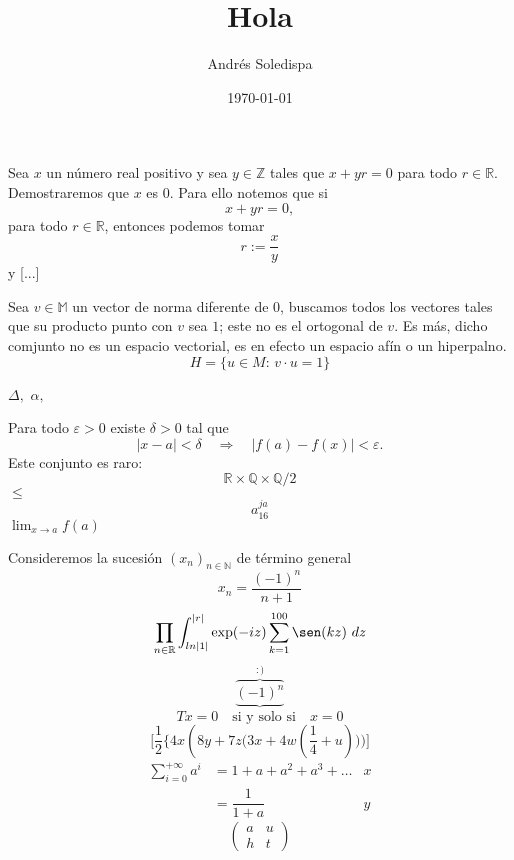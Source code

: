 \documentclass[a4paper,12pt]{article}
\author{Andrés Soledispa}
\title{Hola}
\date{\today}
\begin{document}
\maketitle

Sea \(x\) un número real positivo y sea \(y\in\mathbb{Z}\) tales que
\(
x+yr
%
=0\)
para todo \(r\in\mathbb{R}\). Demostraremos que \(x\) es \(0\).
Para ello notemos que si
\[
x+yr
%
=0,\]
para todo \(r\in\mathbb{R}\), entonces podemos tomar
\[
r:=\dfrac{x}{y}
\]
y [...]
\begin{multicols}{2}
Sea \(v\in\mathbb{M}\) un vector de norma diferente de \(0\), buscamos todos los vectores tales que su producto punto con \(v\) sea \(1\); este no es el ortogonal de \(v\). Es más, dicho comjunto no es un espacio vectorial, es en efecto un espacio afín o un hiperpalno.
\[
	H=\{u\in M :\,v\cdot u=1\}
\]

\(\Delta,\) \(\alpha,\) 
\end{multicols}
Para todo \(\varepsilon > 0\) existe \(\delta > 0\) tal que 
\[
	|x - a|< \delta  \quad \Rightarrow  \quad |f(a) - f(x)| < \varepsilon.
\]
Este conjunto es raro: 
\[
	\mathbb{R} \times \mathbb{Q} \times \mathbb{Q}/2
\]
\(\leq\)
\[
	a_{16}^{ja}
\]
\(
	\displaystyle \lim_{x \to a} f(a)
\)

Consideremos la sucesión 
\(
(x_{n})_{n\in\mathbb{N}}
\)
de término general
\[
x_{n}=\dfrac{(-1)^{n}}{n+1}
\]
\[
	\prod_{n\in\mathbb{R}}\int_{ln|1|}^{|r|}\exp(-iz)\sum_{k=1}^{100} \sen(kz)\ dz
\]
\[
\overbrace{\underbrace{(-1)^{n}}_{}}^{:)}
\]
\[
Tx=0 \quad \text{si y solo si} \quad   x=0
\]
\[
	\Bigg[\dfrac{1}{2} \bigg\{4x \left(8y+7z \big(3x+4w(\dfrac{1}{4}+u)\big)\Big)\right.\Bigg]
\]
\begin{align}
\sum_{i=0}^{+\infty} a^{i}&= 1 + a + a^{2} + a^{3} + \ldots&x \nonumber \\
&=\dfrac{1}{1+a}&y \nonumber
\end{align}
\[
\begin{pmatrix}
a & u\\
h & t
\end{pmatrix}
\]
\end{document}

